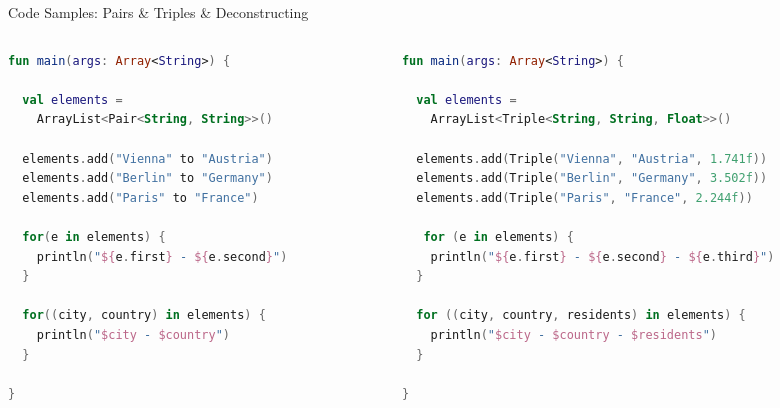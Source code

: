 \begin{frame}[fragile]{Code Samples: Pairs \& Triples \& Deconstructing}
	\begin{columns}
		\begin{column}{0.5\textwidth}
\begin{lstlisting}[language=Kotlin,basicstyle=\ttfamily\tiny]
fun main(args: Array<String>) {

  val elements =
    ArrayList<Pair<String, String>>()

  elements.add("Vienna" to "Austria")
  elements.add("Berlin" to "Germany")
  elements.add("Paris" to "France")

  for(e in elements) {
    println("${e.first} - ${e.second}")
  }

  for((city, country) in elements) {
    println("$city - $country")
  }

}
\end{lstlisting}
		\end{column}
		\begin{column}{0.5\textwidth}
\begin{lstlisting}[language=Kotlin,basicstyle=\ttfamily\tiny]
fun main(args: Array<String>) {

  val elements =
    ArrayList<Triple<String, String, Float>>()

  elements.add(Triple("Vienna", "Austria", 1.741f))
  elements.add(Triple("Berlin", "Germany", 3.502f))
  elements.add(Triple("Paris", "France", 2.244f))

   for (e in elements) {
    println("${e.first} - ${e.second} - ${e.third}")
  }

  for ((city, country, residents) in elements) {
    println("$city - $country - $residents")
  }

}
\end{lstlisting}
		\end{column}
	\end{columns}
\end{frame}

